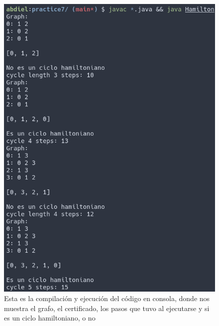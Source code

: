 \documentclass{article}
\begin{document}
    \begin{figure}[h!]
        \centering
        \includegraphics[width=0.4\textheight]{out_console_1.png}
        \caption{Esta es la compilación y ejecución del código en consola, donde nos muestra el grafo, el certificado, los pasos que tuvo al ejecutarse y si es un ciclo hamiltoniano, o no}
        \label{fig:my_label}
    \end{figure}
    \newpage
    
\end{document}
